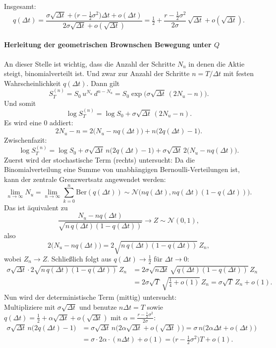Insgesamt:
$$
q(\Delta t) = \frac{\sigma \sqrt{\Delta t} + \big(r - \tfrac12 \sigma^2\big)\Delta t + o(\Delta t)}{2\sigma \sqrt{\Delta t} + o(\sqrt{\Delta t})}
= \tfrac12 + \frac{r - \tfrac12 \sigma^2}{2\sigma}\,\sqrt{\Delta t} + o(\sqrt{\Delta t}).
$$

\paragraph{Herleitung der geometrischen Brownschen Bewegung unter $Q$}
An dieser Stelle ist wichtig, dass die Anzahl der Schritte $N_u$ in denen die Aktie steigt, binomialverteilt ist.
Und zwar zur Anzahl der Schritte $n=T/\Delta t$ mit festen Wahrscheinlichkeit $q(\Delta t)$.
Dann gilt
$$
S_T^{(n)} = S_0\, u^{N_u}\, d^{n-N_u}
= S_0 \exp\!\big(\sigma \sqrt{\Delta t}\,(2N_u - n)\big).
$$
Und somit
$$
\log S_T^{(n)}
= \log S_0 + \sigma \sqrt{\Delta t}\,(2N_u - n).
$$
Es wird eine 0 addiert:
$$
2N_u - n
= 2\big(N_u - n q(\Delta t)\big) + n\big(2q(\Delta t)-1\big).
$$
Zwischenfazit:
$$
\log S_T^{(n)}
= \log S_0 + \sigma \sqrt{\Delta t}\, n\big(2q(\Delta t)-1\big)
+ \sigma \sqrt{\Delta t}\, 2\big(N_u - n q(\Delta t)\big).
$$
Zuerst wird der stochastische Term (rechts) untersucht: Da die Binomialverteilung eine Summe von unabhängigen Bernoulli-Verteilungen ist, kann der zentrale Grenzwertsatz angewendet werden:
$$
\lim_{n\to\infty} N_u = \lim_{n \to \infty} \sum_{k=0}^{n}\text{Ber}(q(\Delta t)) \sim \mathcal N\big(n q(\Delta t), n q(\Delta t)(1-q(\Delta t))\big).
$$
Das ist äquivalent zu
$$
\frac{N_u - n q(\Delta t)}{\sqrt{n\,q(\Delta t)(1-q(\Delta t))}} \longrightarrow Z\sim \mathcal N(0,1),
$$
also
$$
2\big(N_u - n q(\Delta t)\big) = 2\sqrt{n\,q(\Delta t)(1-q(\Delta t))}\,Z_n,
$$
wobei $Z_n\longrightarrow Z$.
Schließlich folgt aus $q(\Delta t)\to \tfrac12$ für $\Delta t\to 0$:
$$
\begin{aligned}
\sigma \sqrt{\Delta t}\cdot 2\sqrt{n\,q(\Delta t)(1-q(\Delta t))}\,Z_n
&= 2\sigma \sqrt{n\Delta t}\,\sqrt{q(\Delta t)(1-q(\Delta t))}\,Z_n \\
&= 2\sigma \sqrt{T}\,\sqrt{\tfrac14 + o(1)}\,Z_n
= \sigma \sqrt{T}\,Z_n + o(1).
\end{aligned}
$$
Nun wird der deterministische Term (mittig) untersucht:
\\ Multipliziere mit $\sigma \sqrt{\Delta t}$ und benutze $n\Delta t=T$ sowie $q(\Delta t)=\tfrac12 + \alpha \sqrt{\Delta t} + o(\sqrt{\Delta t})$ mit
$\alpha=\frac{r-\frac12\sigma^2}{2\sigma}$:
$$
\begin{aligned}
\sigma \sqrt{\Delta t}\, n\big(2q(\Delta t)-1\big)
&= \sigma \sqrt{\Delta t}\, n\big(2\alpha \sqrt{\Delta t} + o(\sqrt{\Delta t})\big)
= \sigma\, n \big(2\alpha \Delta t + o(\Delta t)\big) \\
&= \sigma \cdot 2\alpha \cdot (n\Delta t) + o(1)
= \big(r - \tfrac12 \sigma^2\big)T + o(1).
\end{aligned}
$$
